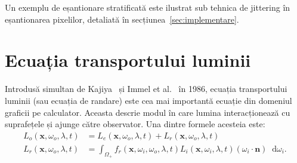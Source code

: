 \documentclass[12pt,a4paper]{report}
\newcommand*\diff{\mathop{}\!\mathrm{d}}
\numberwithin{equation}{section} %
\begin{document}
Un exemplu de eșantionare stratificată este ilustrat sub tehnica de jittering
în eșantionarea pixelilor, detaliată în secțiunea~\ref{sec:implementare}.

\section{Ecuația transportului luminii}

Introdusă simultan de Kajiya~\cite{Kajiya} și Immel et al.~\cite{Immel} în 1986,
ecuația transportului luminii (sau ecuația de randare) este cea mai importantă ecuație din domeniul
graficii pe calculator. Aceasta descrie modul în care lumina interacționează
cu suprafețele și ajunge către observator. Una dintre formele acesteia este:
\begin{equation}
	\label{eq:light_transport}
	\begin{aligned}
		L_o(\mathbf{x}, \omega_o, \lambda, t) & = L_e(\mathbf{x}, \omega_o, \lambda, t) + L_r(\mathbf{x}, \omega_o, \lambda, t)                                                                     \\
		L_r(\mathbf{x}, \omega_o, \lambda, t) & = \int_{\Omega_+} f_r(\mathbf{x}, \omega_i, \omega_o, \lambda, t) L_i(\mathbf{x}, \omega_i, \lambda, t) (\omega_i \cdot \mathbf{n}) \diff \omega_i.
	\end{aligned}
\end{equation}
\end{document}
